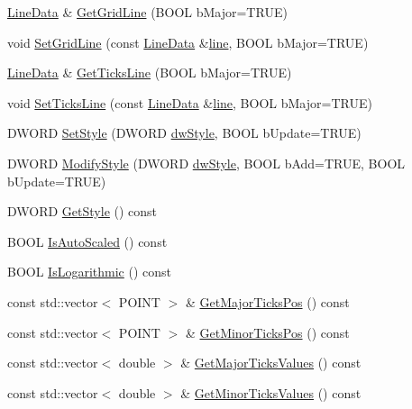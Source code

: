 \begin{DoxyCompactItemize}
\item 
\hyperlink{class_line_data}{Line\-Data} \& \hyperlink{class_axis_a8500f77c11f6ebef7af8d41050c4f2c1}{Get\-Grid\-Line} (B\-O\-O\-L b\-Major=T\-R\-U\-E)
\item 
void \hyperlink{class_axis_abba8f8d055ffcc6f3a3660d4adb57374}{Set\-Grid\-Line} (const \hyperlink{class_line_data}{Line\-Data} \&\hyperlink{class_axis_a68817bcf5ea38ff2d81698175ae9c6ee}{line}, B\-O\-O\-L b\-Major=T\-R\-U\-E)
\item 
\hyperlink{class_line_data}{Line\-Data} \& \hyperlink{class_axis_a0f12d8e5e59f15a716ef1c2e89b1ff8c}{Get\-Ticks\-Line} (B\-O\-O\-L b\-Major=T\-R\-U\-E)
\item 
void \hyperlink{class_axis_a94241668c2515bf0750cafd53bcb1a42}{Set\-Ticks\-Line} (const \hyperlink{class_line_data}{Line\-Data} \&\hyperlink{class_axis_a68817bcf5ea38ff2d81698175ae9c6ee}{line}, B\-O\-O\-L b\-Major=T\-R\-U\-E)
\item 
D\-W\-O\-R\-D \hyperlink{class_axis_a1b3b93b1d47ab3ca2ec8b906fee6834b}{Set\-Style} (D\-W\-O\-R\-D \hyperlink{class_axis_a9b318f5e15215edb80d3a2bdabc11d44}{dw\-Style}, B\-O\-O\-L b\-Update=T\-R\-U\-E)
\item 
D\-W\-O\-R\-D \hyperlink{class_axis_ac4dc48e8a0ac1cdb24a24f5d45639951}{Modify\-Style} (D\-W\-O\-R\-D \hyperlink{class_axis_a9b318f5e15215edb80d3a2bdabc11d44}{dw\-Style}, B\-O\-O\-L b\-Add=T\-R\-U\-E, B\-O\-O\-L b\-Update=T\-R\-U\-E)
\item 
D\-W\-O\-R\-D \hyperlink{class_axis_a6d6b201a4cce9a6beb8c7055864041ef}{Get\-Style} () const 
\item 
B\-O\-O\-L \hyperlink{class_axis_aaf7ef6cc19a70108d2d86f563b8e822b}{Is\-Auto\-Scaled} () const 
\item 
B\-O\-O\-L \hyperlink{class_axis_a53dc750e1923bf84666d5b7f6c47609e}{Is\-Logarithmic} () const 
\item 
const std\-::vector$<$ P\-O\-I\-N\-T $>$ \& \hyperlink{class_axis_a66f64f1eb719f41512b4ac5cf049a7d2}{Get\-Major\-Ticks\-Pos} () const 
\item 
const std\-::vector$<$ P\-O\-I\-N\-T $>$ \& \hyperlink{class_axis_a4ed3bd789234570a2dfe659dcf0767b0}{Get\-Minor\-Ticks\-Pos} () const 
\item 
const std\-::vector$<$ double $>$ \& \hyperlink{class_axis_a2fe9d0e77dbe887d715d51f88941867f}{Get\-Major\-Ticks\-Values} () const 
\item 
const std\-::vector$<$ double $>$ \& \hyperlink{class_axis_ae278ff239a05ef1d7b76bb37e752dccf}{Get\-Minor\-Ticks\-Values} () const 

\end{DoxyCompactItemize}
